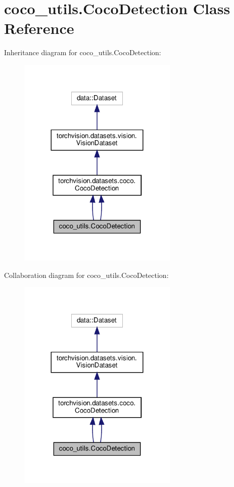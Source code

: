 \hypertarget{classcoco__utils_1_1CocoDetection}{}\section{coco\+\_\+utils.\+Coco\+Detection Class Reference}
\label{classcoco__utils_1_1CocoDetection}


Inheritance diagram for coco\+\_\+utils.\+Coco\+Detection\+:
\nopagebreak
\begin{figure}[H]
\begin{center}
\leavevmode
\includegraphics[width=216pt]{classcoco__utils_1_1CocoDetection__inherit__graph}
\end{center}
\end{figure}


Collaboration diagram for coco\+\_\+utils.\+Coco\+Detection\+:
\nopagebreak
\begin{figure}[H]
\begin{center}
\leavevmode
\includegraphics[width=216pt]{classcoco__utils_1_1CocoDetection__coll__graph}
\end{center}
\end{figure}
